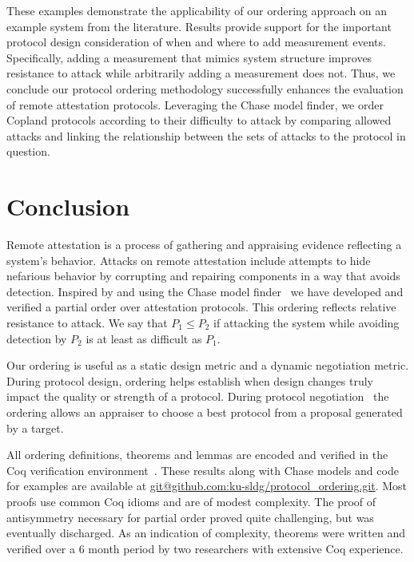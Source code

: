 \documentclass[runningheads]{llncs}
\theoremstyle{definition}
\begin{document}
These examples demonstrate the applicability of our ordering approach
on an example system from the literature.  Results provide support for
the important protocol design consideration of when and where to add
measurement events.  Specifically, adding a measurement that mimics
system structure improves resistance to attack while arbitrarily adding a
measurement does not.  Thus, we
conclude our protocol ordering methodology successfully enhances the
evaluation of remote attestation protocols.  Leveraging the Chase
model finder, we order Copland protocols according to their difficulty 
to attack by comparing allowed attacks and linking the
relationship between the sets of attacks to the protocol in question.

\section{Conclusion}

Remote attestation is a process of gathering and appraising evidence
reflecting a system's behavior.  Attacks on remote attestation include
attempts to hide nefarious behavior by corrupting and repairing
components in a way that avoids detection.  Inspired by
\citet{Rowe:2021:OnOrdering} and using the Chase model
finder~\citep{Ramsdell:2020:Chase} we have developed and verified a
partial order over attestation protocols.  This ordering reflects
relative resistance to attack.  We say that $P_1 \leq P_2$ if attacking
the system while avoiding detection by $P_2$ is at least as difficult as $P_1$.

Our ordering is useful as a static design metric and a dynamic
negotiation metric.  During protocol design, ordering helps establish
when design changes truly impact the quality or strength of a
protocol.  During protocol negotiation~\citep{Fritz:2023:framework}
the ordering allows an appraiser to choose a best protocol from a
proposal generated by a target.

All ordering definitions, theorems and lemmas are encoded and verified
in the Coq verification environment~\citep{Bertot:2013aa}. These
results along with Chase models and code for examples are available at
\url{git@github.com:ku-sldg/protocol_ordering.git}.  Most proofs use
common Coq idioms and are of modest complexity.  The proof of
antisymmetry necessary for partial order proved quite challenging, but
was eventually discharged.  As an indication of complexity, theorems
were written and verified over a 6 month period by two researchers
with extensive Coq experience.
\end{document}
